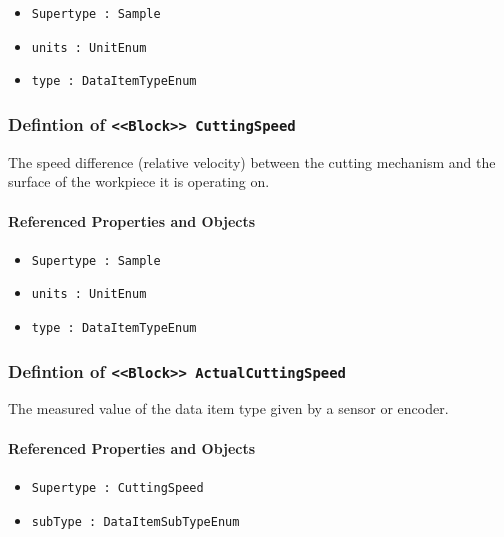 \begin{itemize}
\item \texttt{Supertype : Sample}

\item \texttt{units : UnitEnum}

\item \texttt{type : DataItemTypeEnum}

\end{itemize}
\FloatBarrier
\subsubsection{Defintion of \texttt{<<Block>> CuttingSpeed}}
  \label{type:CuttingSpeed}

\FloatBarrier

The speed difference (relative velocity) between the cutting mechanism and the surface of the workpiece it is operating on.

\FloatBarrier
\paragraph{Referenced Properties and Objects}

\begin{itemize}
\item \texttt{Supertype : Sample}

\item \texttt{units : UnitEnum}

\item \texttt{type : DataItemTypeEnum}

\end{itemize}
\FloatBarrier
\subsubsection{Defintion of \texttt{<<Block>> ActualCuttingSpeed}}
  \label{type:ActualCuttingSpeed}

\FloatBarrier

The measured value of the data item type given by a sensor or encoder.

\FloatBarrier
\paragraph{Referenced Properties and Objects}

\begin{itemize}
\item \texttt{Supertype : CuttingSpeed}

\item \texttt{subType : DataItemSubTypeEnum}

\end{itemize}
\FloatBarrier
